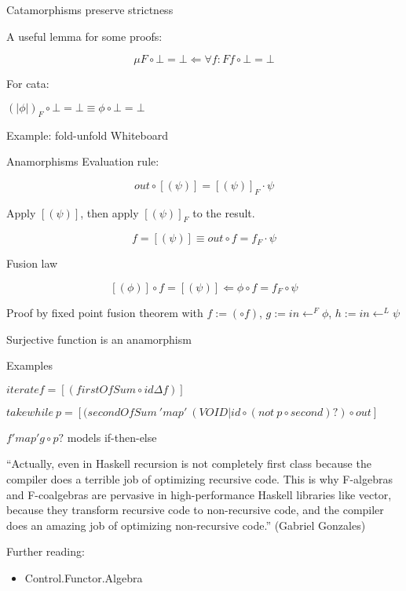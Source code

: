 \documentclass{beamer}
\begin{document}
\begin{frame}{Catamorphisms preserve strictness}

A useful lemma for some proofs:

$$\mu F \circ \bot = \bot \Leftarrow \forall f : F f  \circ \bot = \bot$$

For cata:

$(\!|\phi |\!) _{F} \circ \bot = \bot \equiv \phi \circ \bot = \bot $

\end{frame}

\begin{frame}{Example: fold-unfold}
Whiteboard
\end{frame}

\begin{frame}{Anamorphisms}
Evaluation rule:


$$out \circ [\!(\psi )\!] = [\!(\psi )\!] _F \cdot \psi$$

Apply $[\!(\psi )\!] $, then apply $[\!(\psi )\!]_F$ to the result.

$$f = [\!(\psi )\!]  \equiv out \circ f = f_F \cdot \psi$$

\end{frame}

\begin{frame}{Fusion law} 

$$[\!(\phi )\!] \circ f = [\!(\psi )\!]  \Leftarrow \phi \circ f = f_F \circ \psi$$

Proof by fixed point fusion theorem with $f := (\circ f)$, $g := in \leftarrow^F \phi $, $h :=in \leftarrow^L \psi$

\end{frame}
\begin{frame}{Surjective function is an anamorphism}


\end{frame}
\begin{frame}{Examples}

$iterate f = [\!(firstOfSum \circ id \Delta f  )\!] $

$takewhile\ p = [\!(secondOfSum\ 'map'\  (VOID  | id \circ ( not\ p \circ second)? ) \circ out \!] $

$f 'map' g \circ p?$ models if-then-else

\end{frame}
\begin{frame}


``Actually, even in Haskell recursion is not completely first class because the compiler does a terrible job of optimizing recursive code. This is why F-algebras and F-coalgebras are pervasive in high-performance Haskell libraries like vector, because they transform recursive code to non-recursive code, and the compiler does an amazing job of optimizing non-recursive code.'' (Gabriel Gonzales)

\end{frame}
\begin{frame}
Further reading:
\begin{itemize}
\item Control.Functor.Algebra
\end{itemize}
\end{frame}
\end{document}
